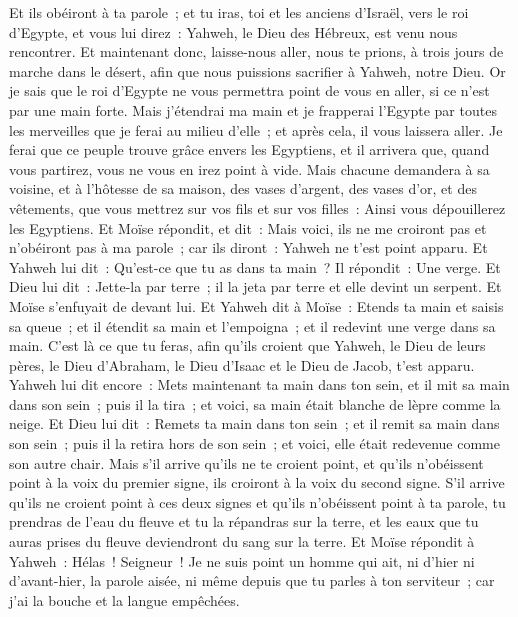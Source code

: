 \begin{multicols}{2}
Et ils obéiront à ta parole~; et tu iras, toi et les anciens d'Israël, vers le roi d'Egypte, et vous lui direz~: Yahweh, le Dieu des Hébreux, est venu nous rencontrer. Et maintenant donc, laisse-nous aller, nous te prions, à trois jours de marche dans le désert, afin que nous puissions sacrifier à Yahweh, notre Dieu.
Or je sais que le roi d'Egypte ne vous permettra point de vous en aller, si ce n'est par une main forte.
Mais j'étendrai ma main et je frapperai l'Egypte par toutes les merveilles que je ferai au milieu d'elle~; et après cela, il vous laissera aller.
Je ferai que ce peuple trouve grâce envers les Egyptiens, et il arrivera que, quand vous partirez, vous ne vous en irez point à vide.
Mais chacune demandera à sa voisine, et à l'hôtesse de sa maison, des vases d'argent, des vases d'or, et des vêtements, que vous mettrez sur vos fils et sur vos filles~: Ainsi vous dépouillerez les Egyptiens.
\VerseOne{}Et Moïse répondit, et dit~: Mais voici, ils ne me croiront pas et n'obéiront pas à ma parole~; car ils diront~: Yahweh ne t'est point apparu.
Et Yahweh lui dit~: Qu'est-ce que tu as dans ta main~? Il répondit~: Une verge.
Et Dieu lui dit~: Jette-la par terre~; il la jeta par terre et elle devint un serpent. Et Moïse s'enfuyait de devant lui.
Et Yahweh dit à Moïse~: Etends ta main et saisis sa queue~; et il étendit sa main et l'empoigna~; et il redevint une verge dans sa main.
C'est là ce que tu feras, afin qu'ils croient que Yahweh, le Dieu de leurs pères, le Dieu d'Abraham, le Dieu d'Isaac et le Dieu de Jacob, t'est apparu.
Yahweh lui dit encore~: Mets maintenant ta main dans ton sein, et il mit sa main dans son sein~; puis il la tira~; et voici, sa main était blanche de lèpre comme la neige.
Et Dieu lui dit~: Remets ta main dans ton sein~; et il remit sa main dans son sein~; puis il la retira hors de son sein~; et voici, elle était redevenue comme son autre chair.
Mais s'il arrive qu'ils ne te croient point, et qu'ils n'obéissent point à la voix du premier signe, ils croiront à la voix du second signe.
S'il arrive qu'ils ne croient point à ces deux signes et qu'ils n'obéissent point à ta parole, tu prendras de l'eau du fleuve et tu la répandras sur la terre, et les eaux que tu auras prises du fleuve deviendront du sang sur la terre.
Et Moïse répondit à Yahweh~: Hélas~! Seigneur~! Je ne suis point un homme qui ait, ni d'hier ni d'avant-hier, la parole aisée, ni même depuis que tu parles à ton serviteur~; car j'ai la bouche et la langue empêchées.

\end{multicols}
